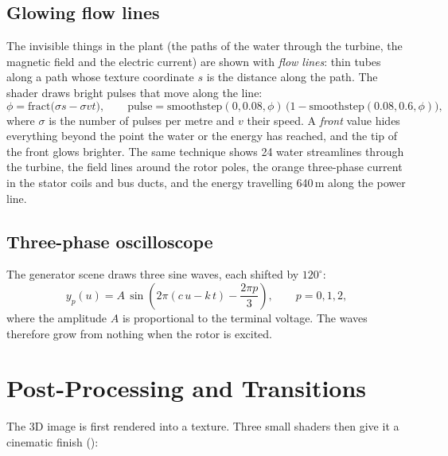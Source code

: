 \documentclass[11pt,a4paper]{report}
\newcommand{\code}[1]{\texttt{\detokenize{#1}}}
\begin{document}
\subsection{Glowing flow lines}

The invisible things in the plant (the paths of the water through the turbine, the
magnetic field and the electric current) are shown with \emph{flow lines}: thin tubes
along a path whose texture coordinate $s$ is the distance along the path. The shader
draws bright pulses that move along the line:
\begin{equation}
\phi = \text{fract}\big(\sigma s - \sigma v t\big),\qquad
\text{pulse} = \text{smoothstep}(0, 0.08, \phi)\,\big(1-\text{smoothstep}(0.08, 0.6, \phi)\big),
\end{equation}
where $\sigma$ is the number of pulses per metre and $v$ their speed. A \emph{front}
value hides everything beyond the point the water or the energy has reached, and the
tip of the front glows brighter. The same technique shows 24 water streamlines through
the turbine, the field lines around the rotor poles, the orange three-phase current in
the stator coils and bus ducts, and the energy travelling 640\,m along the power line.

\subsection{Three-phase oscilloscope}

The generator scene draws three sine waves, each shifted by $120^\circ$:
\begin{equation}
y_p(u) = A\,\sin\!\left(2\pi(c\,u - k\,t) - \frac{2\pi p}{3}\right),\qquad p = 0, 1, 2,
\end{equation}
where the amplitude $A$ is proportional to the terminal voltage. The waves therefore
grow from nothing when the rotor is excited.

\section{Post-Processing and Transitions}

The 3D image is first rendered into a texture. Three small shaders then give it a
cinematic finish (\code{render/PostFX.cpp}):
\end{document}
